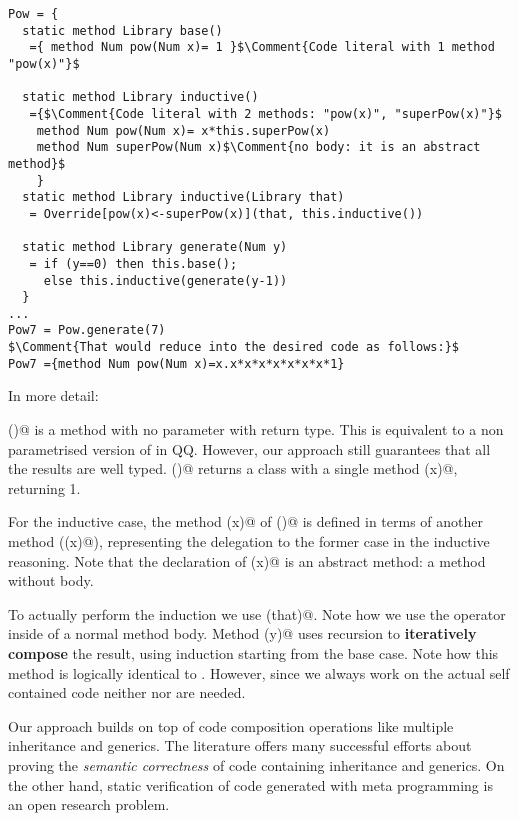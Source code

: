 \begin{lstlisting}
Pow = {
  static method Library base()
   ={ method Num pow(Num x)= 1 }$\Comment{Code literal with 1 method "pow(x)"}$

  static method Library inductive()
   ={$\Comment{Code literal with 2 methods: "pow(x)", "superPow(x)"}$
    method Num pow(Num x)= x*this.superPow(x)
    method Num superPow(Num x)$\Comment{no body: it is an abstract method}$
    }
  static method Library inductive(Library that)
   = Override[pow(x)<-superPow(x)](that, this.inductive())
  
  static method Library generate(Num y)
   = if (y==0) then this.base();
     else this.inductive(generate(y-1))
  }
...
Pow7 = Pow.generate(7)
$\Comment{That would reduce into the desired code as follows:}$
Pow7 ={method Num pow(Num x)=x.x*x*x*x*x*x*x*1}
\end{lstlisting}

\noindent In more detail:

\Q@base()@ is a method with no parameter with \Q@Library@ return type.
This is equivalent to a non parametrised version of \Q@Expr@ in QQ.
However, our approach still guarantees that all the results are well typed.
\Q@base()@ returns a class with a single method \Q@pow(x)@,
returning 1.

For the inductive case, the method \Q@pow(x)@ of \Q@inductive()@ is defined in terms of
another method (\Q@superPow(x)@), representing the delegation to
the former case in the inductive reasoning.
Note that the declaration of \Q@superPow(x)@ is an abstract method: a method without body.

To actually perform the induction we use \Q@inductive(that)@.
Note how we use the operator \Q@Override@ inside of a normal method body.
Method \Q@generate(y)@ uses recursion to \textbf{iteratively compose} the result, using induction starting from
the base case.
Note how this method is logically identical to \Q@powerAux@. However,
since we always work on the actual self contained code neither \Q@lambdaX@ nor \Q@compile@ are needed.

Our approach builds on top of code composition operations like multiple inheritance and generics.
The literature offers \cite{barnett2004spec,burdy2005overview,muller2016viper} many successful efforts about proving the
\emph{semantic correctness} 
of code containing inheritance and generics.
On the other hand, static verification of code generated with meta programming is an open research problem.

